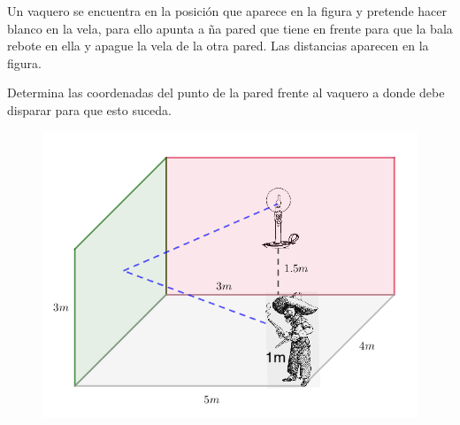 \begin{ejre}
	Un vaquero se encuentra en la posición que aparece en la figura y pretende hacer blanco en la vela, para ello apunta a ña pared que tiene en frente para que la bala rebote en ella y apague la vela de la otra pared. Las distancias aparecen en la figura.
	
	Determina las coordenadas del punto de la pared frente al vaquero a donde debe disparar para que esto suceda.

	\begin{figure}[H]
		\centering
		\includegraphics[width=.9\textwidth]{imagenes/imagenes11/vaquero.png}
	\end{figure}
	
	
	
\end{ejre}
